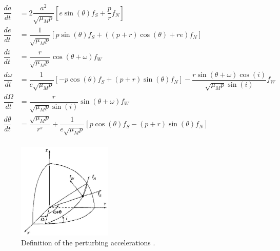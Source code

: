 
\begin{equation} \label{eq:gauss}
\begin{split}
\dfrac{da}{dt}&=2\dfrac{a^{2}}{\sqrt{\mu_{M}p}}\left[e\sin\left(\theta\right)f_{S}+\dfrac{p}{r}f_{N}\right]\\
\dfrac{de}{dt}&=\dfrac{1}{\sqrt{\mu_{M}p}}\left[p\sin\left(\theta\right)f_{S}+\left(\left(p+r\right)\cos\left(\theta\right)+re\right)f_{N}\right]\\
\dfrac{di}{dt}&=\dfrac{r}{\sqrt{\mu_{M}p}}\cos\left(\theta+\omega\right)f_{W}\\
\dfrac{d\omega}{dt}&=\dfrac{1}{e \sqrt{\mu_{M}p}}\left[-p\cos\left(\theta\right)f_{S}+\left(p+r\right)\sin\left(\theta\right)f_{N}\right]-\dfrac{r\sin\left(\theta+\omega\right)\cos\left(i\right)}{\sqrt{\mu_{M}p}\sin\left(i\right)}f_{W}\\
\dfrac{d\Omega}{dt}&=\dfrac{r}{\sqrt{\mu_{M}p}\sin\left(i\right)}\sin\left(\theta+\omega\right)f_{W}\\
\dfrac{d\theta}{dt}&=\dfrac{\sqrt{\mu_{M}p}}{r^{s}}+\dfrac{1}{e \sqrt{\mu_{M}p}}\left[p\cos\left(\theta\right)f_{S}-\left(p+r\right)\sin\left(\theta\right)f_{N}\right]\\
\end{split}
\end{equation}


\begin{figure}[!ht]
\centering
\includegraphics[width=0.4\textwidth]{figures/transfer_orbits/sc_acc_wakker2010.jpg}
\caption{Definition of the perturbing accelerations \cite{wakker2010}.}
\label{fig:sc_acc_wakker2010}
\end{figure}

